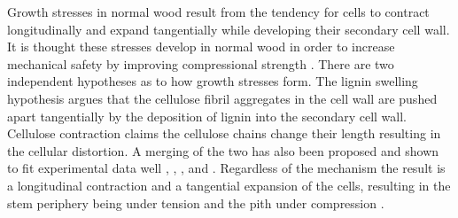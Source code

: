 Growth stresses in normal wood result from the tendency for cells to contract longitudinally and expand tangentially while developing their secondary cell wall. It is thought these stresses develop in normal wood in order to increase mechanical safety by improving compressional strength \cite{mattheck1997wood}. There are two independent hypotheses as to how growth stresses form. The lignin swelling hypothesis \cite{ISI:A1950XU10300003} argues that the cellulose fibril aggregates in the cell wall are pushed apart tangentially by the deposition of lignin into the secondary cell wall. Cellulose contraction \cite{Bamber1979}\cite{bamber2001general} claims the cellulose chains change their length resulting in the cellular distortion. A merging of the two has also been proposed and shown to fit experimental data well \cite{okuyama1986}, \cite{Okuyama_1994}, \cite{yamamoto1991}, \cite{ISI:A1992HP18200001} and \cite{Yamamoto_1998}. Regardless of the mechanism the result is a longitudinal contraction and a tangential expansion of the cells, resulting in the stem periphery being under tension and the pith under compression \cite{Archer_1987}. 